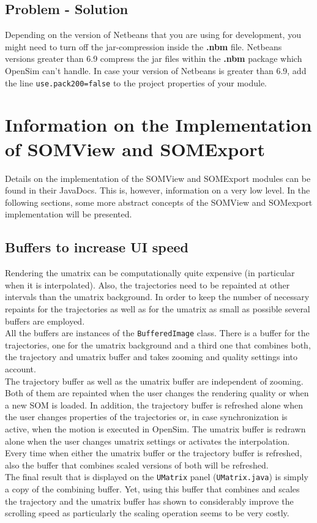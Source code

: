 \documentclass[a4paper]{scrartcl}
\begin{document}
\subsection{Problem - Solution}
Depending on the version of Netbeans that you are using for development, you might need to turn off the jar-compression inside the \textbf{.nbm} file. Netbeans versions greater than 6.9 compress the jar files within the \textbf{.nbm} package which OpenSim can't handle.
In case your version of Netbeans is greater than 6.9, add the line \verb|use.pack200=false| to the project properties of your module.


\section{Information on the Implementation of SOMView and SOMExport}
\label{sec:somview-export-implementation}
Details on the implementation of the SOMView and SOMExport modules can be found in their JavaDocs.
This is, however, information on a very low level. In the following sections, some more abstract concepts of the SOMView and SOMexport implementation will be presented.
\subsection{Buffers to increase UI speed}
Rendering the umatrix can be computationally quite expensive (in particular when it is interpolated). Also, the trajectories need to be repainted at other intervals than the umatrix background. In order to keep the number of necessary repaints for the trajectories as well as for the umatrix as small as possible several buffers are employed.\\
All the buffers are instances of the \verb|BufferedImage| class. There is a buffer for the trajectories, one for the umatrix background and a third one that combines both, the trajectory and umatrix buffer and takes zooming and quality settings into account.\\
The trajectory buffer as well as the umatrix buffer are independent of zooming. Both of them are repainted when the user changes the rendering quality or when a new SOM is loaded. In addition, the trajectory buffer is refreshed alone when the user changes properties of the trajectories or, in case synchronization is active, when the motion is executed in OpenSim.
The umatrix buffer is redrawn alone when the user changes umatrix settings or activates the interpolation. \\
Every time when either the umatrix buffer or the trajectory buffer is refreshed, also the buffer that combines scaled versions of both will be refreshed.\\
The final result that is displayed on the \verb|UMatrix| panel (\verb|UMatrix.java|) is simply a copy of the combining buffer.
Yet, using this buffer that combines and scales the trajectory and the umatrix buffer has shown to considerably improve the scrolling speed as particularly the scaling operation seems to be very costly.
\end{document}
